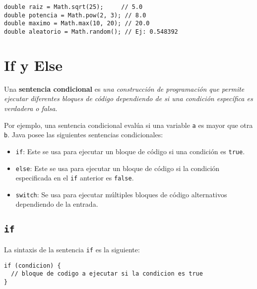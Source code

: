 \documentclass[12pt]{article}
\theoremstyle{largebreak}
\begin{document}
    \begin{exa}
        \begin{lstlisting}[caption={Operaciones con la clase Math.},label=DescriptiveLabel]
double raiz = Math.sqrt(25);     // 5.0
double potencia = Math.pow(2, 3); // 8.0
double maximo = Math.max(10, 20); // 20.0
double aleatorio = Math.random(); // Ej: 0.548392
        \end{lstlisting}
    \end{exa}

    \section{If y Else}

    \begin{mydef}
        Una \textbf{sentencia condicional} es \textit{una construcción de programación que permite ejecutar diferentes bloques de código dependiendo de si una condición específica es verdadera o falsa}.
    \end{mydef}

    Por ejemplo, una sentencia condicional evalúa si una variable \lstinline|a| es mayor que otra \lstinline|b|. Java posee las siguientes sentencias condicionales:

    \begin{itemize}
        \item \lstinline|if|: Este se usa para ejecutar un bloque de código si una condición es \lstinline|true|.
        \item \lstinline|else|: Este se usa para ejecutar un bloque de código si la condición especificada en el \lstinline|if| anterior es \lstinline|false|. 
        \item \lstinline|switch|: Se usa para ejecutar múltiples bloques de código alternativos dependiendo de la entrada.
    \end{itemize}

    \subsection{\lstinline|if|}

    La sintaxis de la sentencia \lstinline|if| es la siguiente:
    \begin{lstlisting}[caption={Sintaxis de la sentencia \lstinline|if|.},label=DescriptiveLabel]
if (condicion) {
  // bloque de codigo a ejecutar si la condicion es true
}
    \end{lstlisting}
\end{document}
